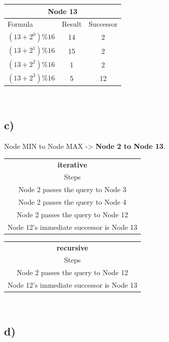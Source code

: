 \documentclass{article}
\begin{document}
      \quad
      \begin{tabular}{ |l|c|c| } 
      	\hline
      	\multicolumn{3}{|c|}{Node 13} \\
      	\hline
      	Formula & Result & Successor \\
      	\hline
      	$(13+2^0)\%16$ & 14 & 2 \\ 
      	$(13+2^1)\%16$ & 15 & 2 \\ 
      	$(13+2^2)\%16$ & 1 & 2 \\ 
      	$(13+2^3)\%16$ & 5 & 12 \\
      	\hline
      \end{tabular}\\
  
    \subsection*{c)}
    
      Node MIN to Node MAX -> \textbf{Node 2 to Node 13}. \\
      \newline
      \begin{tabular}{ |c| } 
      	\hline
      	\textbf{iterative} \\
      	Steps \\
      	\hline
      	Node 2 passes the query to Node 3\\
      	Node 2 passes the query to Node 4\\
      	Node 2 passes the query to Node 12\\
      	Node 12's immediate successor is Node 13\\
      	\hline
      \end{tabular}
      \quad
      \begin{tabular}{ |c| } 
      	\hline
      	\textbf{recursive} \\
      	Steps \\
      	\hline
      	Node 2 passes the query to Node 12\\
      	Node 12's immediate successor is Node 13\\
      	\hline
      \end{tabular}\\
  
    \newpage
    \subsection*{d)}
    
\end{document}

